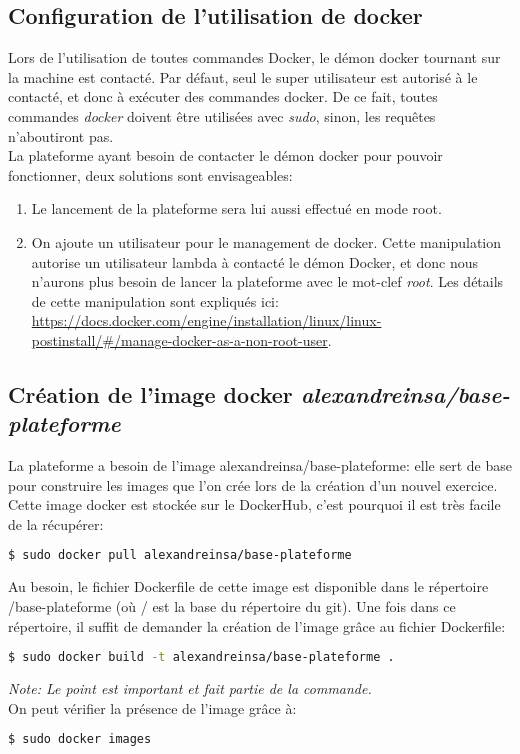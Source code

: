 \documentclass[a4paper]{article}
\begin{document}
\subsection{Configuration de l'utilisation de docker}
Lors de l'utilisation de toutes commandes Docker, le démon docker tournant sur la machine est contacté. Par défaut, seul le super utilisateur est autorisé à le contacté, et donc à exécuter des commandes docker. De ce fait, toutes commandes \textit{docker} doivent être utilisées avec \textit{sudo}, sinon, les requêtes n'aboutiront pas. \\
La plateforme ayant besoin de contacter le démon docker pour pouvoir fonctionner, deux solutions sont envisageables:
\begin{enumerate}
\item Le lancement de la plateforme sera lui aussi effectué en mode root.
\item On ajoute un utilisateur pour le management de docker. Cette manipulation autorise un utilisateur lambda à contacté le démon Docker, et donc nous n'aurons plus besoin de lancer la plateforme avec le mot-clef \textit{root}. Les détails de cette manipulation sont expliqués ici: \url{https://docs.docker.com/engine/installation/linux/linux-postinstall/#/manage-docker-as-a-non-root-user}.
\end{enumerate}

\subsection{Création de l'image docker \textit{alexandreinsa/base-plateforme}}
La plateforme a besoin de l'image alexandreinsa/base-plateforme: elle sert de base pour construire les images que l'on crée lors de la création d'un nouvel exercice. \\
Cette image docker est stockée sur le DockerHub, c'est pourquoi il est très facile de la récupérer:
\begin{lstlisting}[language=bash]
  $ sudo docker pull alexandreinsa/base-plateforme
\end{lstlisting}
Au besoin, le fichier Dockerfile de cette image est disponible dans le répertoire /base-plateforme (où / est la base du répertoire du git).
Une fois dans ce répertoire, il suffit de demander la création de l'image grâce au fichier Dockerfile:
\begin{lstlisting}[language=bash]
  $ sudo docker build -t alexandreinsa/base-plateforme .
\end{lstlisting}
\textit{Note: Le point est important et fait partie de la commande.}\\
On peut vérifier la présence de l'image grâce à:
\begin{lstlisting}[language=bash]
  $ sudo docker images
\end{lstlisting}
\end{document}
